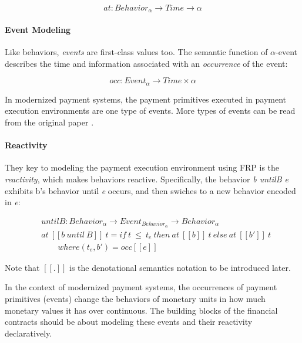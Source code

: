 \begin{equation}
    at : Behavior_{\alpha} \rightarrow Time \rightarrow \alpha
\end{equation}

\paragraph{Event Modeling}

Like behaviors, \textit{events} are first-class values too. The semantic function of $\alpha$-event
describes the time and information associated with an \textit{occurrence} of the event:

\begin{equation}
    occ : Event_{\alpha} \rightarrow Time \times \alpha
\end{equation}

In modernized payment systems, the payment primitives executed in payment execution environments are
one type of events. More types of events can be read from the original paper .

\paragraph{Reactivity}

They key to modeling the payment execution environment using FRP is the \textit{reactivity}, which
makes behaviors reactive. Specifically, the behavior \textit{b untilB e} exhibits b's behavior
until \textit{e} occurs, and then swiches to a new behavior encoded in \textit{e}:

\begin{equation}
    \begin{split}
    &untilB : Behavior_{\alpha} \rightarrow Event_{Behavior_{\alpha}} \rightarrow Behavior_{\alpha} \\
    &at\ [\![b\ until\ B]\!]\ t = if\ t\ \leq\ t_{e}\ then\ at\ [\![b]\!]\ t\ else\ at\ [\![b']\!]\ t \\
    &\qquad where (t_e, b') = occ[\![e]\!]
    \end{split}
\end{equation}

Note that $[\![.]\!]$ is the denotational semantics notation to be introduced later.

In the context of modernized payment systems, the occurrences of payment primitives (events) change
the behaviors of monetary units in how much monetary values it has over continuous. The building
blocks of the financial contracts should be about modeling these events and their reactivity
declaratively.

